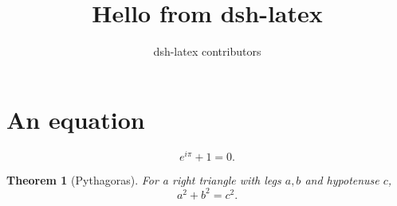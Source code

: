 \documentclass[11pt]{article}
\title{Hello from dsh-latex}
\author{dsh-latex contributors}
\newtheorem{theorem}{Theorem}
\begin{document}
\maketitle

\section{An equation}
\begin{equation}
  e^{i\pi} + 1 = 0.
\end{equation}

\begin{theorem}[Pythagoras]
  For a right triangle with legs $a,b$ and hypotenuse $c$,
  \begin{equation}
    a^2 + b^2 = c^2.
  \end{equation}
\end{theorem}
\end{document}

